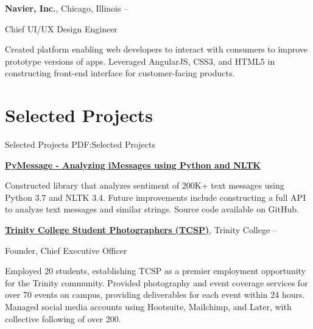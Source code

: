 \documentclass[letterpaper,10pt,oneside]{article}
\begin{document}
\begin{body}
\BigGapNoBreak
{\textbf{Navier, Inc.}},
Chicago, Illinois
\hfill
{} --

\GapNoBreak
\BulletItem
Chief UI/UX Design Engineer
\begin{detail}
\SubBulletItem
Created platform enabling web developers to interact with consumers to improve prototype versions of apps.
\SubBulletItem
Leveraged AngularJS, CSS3, and HTML5 in constructing front-end interface for customer-facing products.
\end{detail}


\noindent\hrulefill
\section
{Selected Projects}
{Selected Projects}
{PDF:Selected Projects}

\href{https://github.com/miloszkowal/PyMessage}
{\textbf{PyMessage - Analyzing iMessages using Python and NLTK}}
\hfill

\GapNoBreak
\BulletItem
Constructed library that analyzes sentiment of 200K+ text messages using Python 3.7 and NLTK 3.4.
\BulletItem
Future improvements include constructing a full API to analyze text messages and similar strings.
\BulletItem
Source code available on GitHub.

\BigGapNoBreak

\href{http://commons.trincoll.edu/tcsp}
{\textbf{Trinity College Student Photographers (TCSP)}},
Trinity College
\hfill
{} --

\GapNoBreak
\BulletItem
Founder, Chief Executive Officer
\begin{detail}
\SubBulletItem
Employed 20 students, establishing TCSP as a premier employment opportunity for the Trinity community.
\SubBulletItem
Provided photography and event coverage services for over 70 events on campus, providing deliverables for each event within 24 hours.
\SubBulletItem
Managed social media accounts using Hootsuite, Mailchimp, and Later, with collective following of over 200.
\end{detail}

\begin{comment}


\href{http://commons.trincoll.edu/tripod}
{\textbf{Trinity Tripod}},
Trinity College
\hfill
\DatestampYMD{2017}{08}{01} --
\DatestampYMD{2018}{01}{01}


\end{comment}
\end{body}
\end{document}
